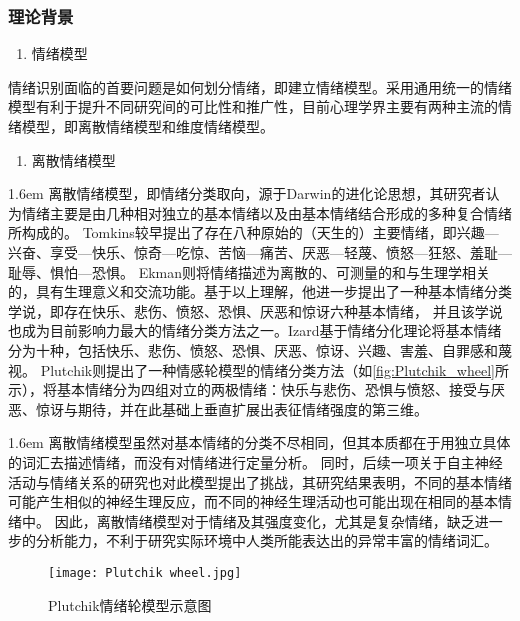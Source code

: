 \subsubsection{理论背景}
\begin{enumerate}
    \item 情绪模型
\end{enumerate}

情绪识别面临的首要问题是如何划分情绪，即建立情绪模型。采用通用统一的情绪模型有利于提升不同研究间的可比性和推广性，目前心理学界主要有两种主流的情绪模型，即离散情绪模型和维度情绪模型。

\begin{enumerate}[\qquad(1)]
    \item 离散情绪模型
\end{enumerate}
    
\hangindent 1.6em
离散情绪模型，即情绪分类取向，源于Darwin的进化论思想\cite{Darwin2015}，其研究者认为情绪主要是由几种相对独立的基本情绪以及由基本情绪结合形成的多种复合情绪所构成的。
Tomkins\cite{Tomkins1970}较早提出了存在八种原始的（天生的）主要情绪，即兴趣—兴奋、享受—快乐、惊奇—吃惊、苦恼—痛苦、厌恶—轻蔑、愤怒—狂怒、羞耻—耻辱、惧怕—恐惧。
Ekman\cite{Ekman1971,Ekman1992}则将情绪描述为离散的、可测量的和与生理学相关的，具有生理意义和交流功能。基于以上理解，他进一步提出了一种基本情绪分类学说，即存在快乐、悲伤、愤怒、恐惧、厌恶和惊讶六种基本情绪，
并且该学说也成为目前影响力最大的情绪分类方法之一。Izard\cite{Izard1991}基于情绪分化理论将基本情绪分为十种，包括快乐、悲伤、愤怒、恐惧、厌恶、惊讶、兴趣、害羞、自罪感和蔑视。
Plutchik\cite{Plutchik2001}则提出了一种情感轮模型的情绪分类方法（如\autoref{fig:Plutchik_wheel}所示），将基本情绪分为四组对立的两极情绪：快乐与悲伤、恐惧与愤怒、接受与厌恶、惊讶与期待，并在此基础上垂直扩展出表征情绪强度的第三维。

\hangindent 1.6em
离散情绪模型虽然对基本情绪的分类不尽相同，但其本质都在于用独立具体的词汇去描述情绪，而没有对情绪进行定量分析。
同时，后续一项关于自主神经活动与情绪关系的研究也对此模型提出了挑战，其研究结果表明，不同的基本情绪可能产生相似的神经生理反应，而不同的神经生理活动也可能出现在相同的基本情绪中\cite{Cacioppo2000}。
因此，离散情绪模型对于情绪及其强度变化，尤其是复杂情绪，缺乏进一步的分析能力，不利于研究实际环境中人类所能表达出的异常丰富的情绪词汇。
\setlength{\belowcaptionskip}{-0.3cm}
\begin{figure}[htbp]
    \centering
    \texttt{[image: Plutchik wheel.jpg]}
    \caption[Plutchik情绪轮模型示意图]{Plutchik情绪轮模型示意图}{\label{fig:Plutchik_wheel}}
\end{figure}

